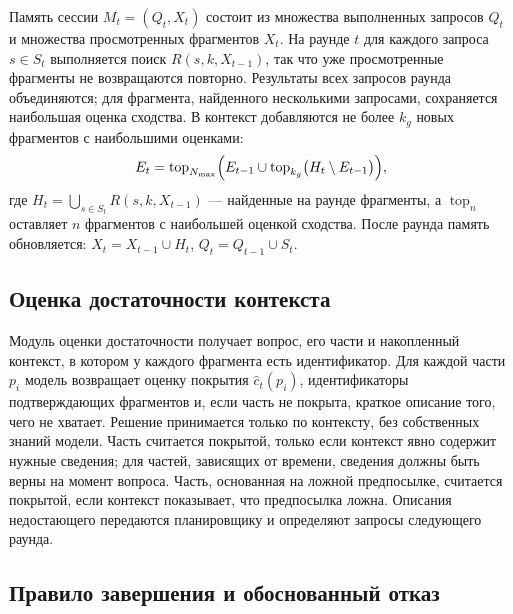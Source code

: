 \documentclass{misisarticle}
\begin{document}
Память сессии $M_t = (Q_t, X_t)$ состоит из множества выполненных запросов $Q_t$ и множества просмотренных фрагментов $X_t$.
На раунде $t$ для каждого запроса $s \in S_t$ выполняется поиск $R(s, k, X_{t-1})$, так что уже просмотренные фрагменты не возвращаются повторно.
Результаты всех запросов раунда объединяются; для фрагмента, найденного несколькими запросами, сохраняется наибольшая оценка сходства.
В контекст добавляются не более $k_g$ новых фрагментов с наибольшими оценками:
\begin{equation}
  E_t = \operatorname{top}_{N_{\max}}\Bigl(E_{t-1} \cup \operatorname{top}_{k_g}\bigl(H_t \setminus E_{t-1}\bigr)\Bigr),
  \label{eq:context}
\end{equation}
где $H_t = \bigcup_{s \in S_t} R(s, k, X_{t-1})$ --- найденные на раунде фрагменты, а $\operatorname{top}_n$ оставляет $n$ фрагментов с наибольшей оценкой сходства.
После раунда память обновляется: $X_t = X_{t-1} \cup H_t$, $Q_t = Q_{t-1} \cup S_t$.

\subsection{Оценка достаточности контекста}

Модуль оценки достаточности получает вопрос, его части и накопленный контекст, в котором у каждого фрагмента есть идентификатор.
Для каждой части $p_i$ модель возвращает оценку покрытия $\hat{c}_t(p_i)$, идентификаторы подтверждающих фрагментов и, если часть не покрыта, краткое описание того, чего не хватает.
Решение принимается только по контексту, без собственных знаний модели.
Часть считается покрытой, только если контекст явно содержит нужные сведения; для частей, зависящих от времени, сведения должны быть верны на момент вопроса.
Часть, основанная на ложной предпосылке, считается покрытой, если контекст показывает, что предпосылка ложна.
Описания недостающего передаются планировщику и определяют запросы следующего раунда.

\subsection{Правило завершения и обоснованный отказ}
\end{document}
